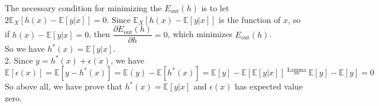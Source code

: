 The necessary condition for minimizing the $E_{\text{out}}(h)$ is to let $2 \mathbb{E}_X\left[h(x)-\mathbb{E}\left[y|x\right]\right]=0$.
Since $\mathbb{E}_X\left[h(x)-\mathbb{E}\left[y|x\right]\right]$ is the function of $x$, so if $h(x)-\mathbb{E}\left[y|x\right]=0$, 
then $\dfrac{\partial E_{\text{out}}(h)}{\partial h}=0$, which minimizes $E_{\text{out}}(h)$.\\
So we have $h^*(x)=\mathbb{E}[y|x]$.\\ 

2. Since $y=h^*(x)+\epsilon(x)$, we have
$$\mathbb{E}[\epsilon(x)]=\mathbb{E}[y-h^*(x)]=\mathbb{E}(y)-\mathbb{E}[h^*(x)]=\mathbb{E}[y]-\mathbb{E}\left[\mathbb{E}[y|x]\right]\stackrel{\text{Lamma}}{=}\mathbb{E}[y]-\mathbb{E}[y]=0$$
So above all, we have prove that $h^*(x)=\mathbb{E}[y|x]$ and $\epsilon(x)$ has expected value zero.\\
\newpage